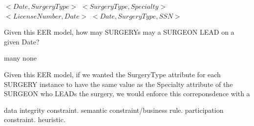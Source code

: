 \documentclass[9pt]{exam}
\begin{document}
\begin{questions}
\begin{choices}
\choice $<Date, SurgeryType>$
\choice $<SurgeryType, Specialty>$
\correctchoice $<LicenseNumber, Date>$
\choice $<Date, SurgeryType, SSN>$
\end{choices}

\question[4] Given this EER model, how may SURGERYs may a SURGEON LEAD on a given Date?

\begin{choices}
\choice many
\choice none
\end{choices}

\question[4] Given this EER model, if we wanted the SurgeryType attribute for each SURGERY instance to have the same value as the Specialty attribute of the SURGEON who LEADs the surgery, we would enforce this correponsdence with a

\begin{choices}
  \choice data integrity constraint.
  \correctchoice semantic constraint/business rule.
  \choice participation constraint.
  \choice heuristic.
\end{choices}


\end{questions}
\end{document}
